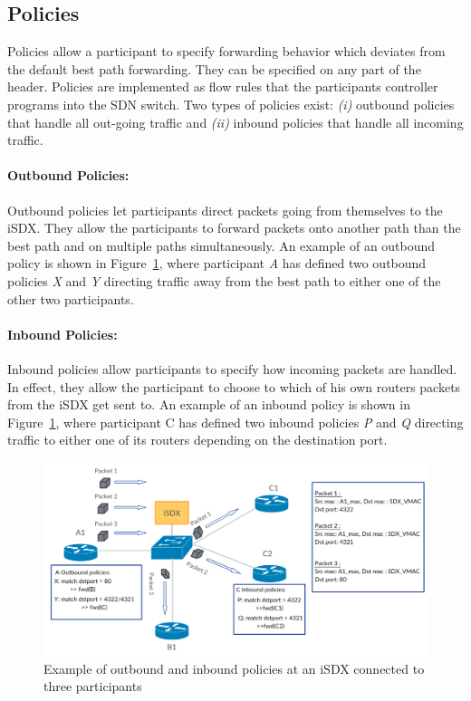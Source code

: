 \subsection{\label{chapter2:iSDX:policies}Policies}
Policies allow a participant to specify forwarding behavior which deviates from the default best path forwarding. They can be specified on any part of the header. Policies are implemented as flow rules that the participants controller programs into the SDN switch. Two types of policies exist: \emph{(i)} outbound policies that handle all out-going traffic and \emph{(ii)} inbound policies that handle all incoming traffic.

\paragraph{\label{chapter2:iSDX:policies:outbound policies}Outbound Policies:}
Outbound policies let participants direct packets going from themselves to the iSDX. They allow the participants to forward packets onto another path than the best path and on multiple paths simultaneously. An example of an outbound policy is shown in Figure~\ref{fig:isdx_policies}, where participant \emph{A} has defined two outbound policies \emph{X} and \emph{Y} directing traffic away from the best path to either one of the other two participants.

\paragraph{\label{chapter2:iSDX:policies:inbound policies}Inbound Policies:}
Inbound policies allow participants to specify how incoming packets are handled. In effect, they allow the participant to choose to which of his own routers packets from the iSDX get sent to. An example of an inbound policy is shown in Figure~\ref{fig:isdx_policies}, where participant C has defined two inbound policies \emph{P} and \emph{Q} directing traffic to either one of its routers depending on the destination port. 

\begin{figure}[h]
\center
\includegraphics[scale = 0.31]{Figures/sdx_policies.pdf}
\caption{Example of outbound and inbound policies at an iSDX connected to three participants}
\label{fig:isdx_policies}
\end{figure}
  


